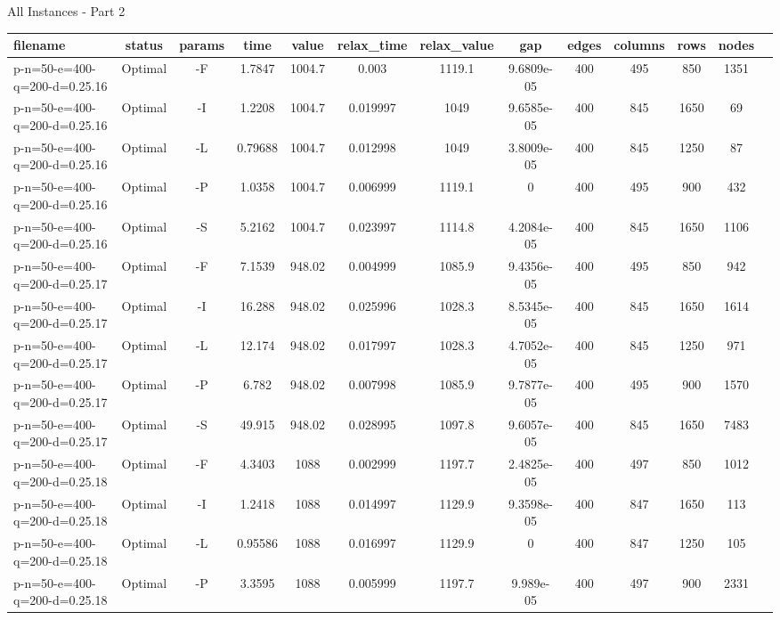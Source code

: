 \documentclass[landscape, a4paper]{article}
\begin{document}
\begin{center}
All Instances - Part 2

\begin{tabular}{lcccccccccccc}
filename & status & params & time & value & relax\_time & relax\_value & gap & edges & columns & rows & nodes & \\
\hline
p-n=50-e=400-q=200-d=0.25.16 & Optimal & -F & 1.7847 & 1004.7 & 0.003 & 1119.1 & 9.6809e-05 & 400 & 495 & 850 & 1351 & \\
p-n=50-e=400-q=200-d=0.25.16 & Optimal & -I & 1.2208 & 1004.7 & 0.019997 & 1049 & 9.6585e-05 & 400 & 845 & 1650 & 69 & \\
p-n=50-e=400-q=200-d=0.25.16 & Optimal & -L & 0.79688 & 1004.7 & 0.012998 & 1049 & 3.8009e-05 & 400 & 845 & 1250 & 87 & \\
p-n=50-e=400-q=200-d=0.25.16 & Optimal & -P & 1.0358 & 1004.7 & 0.006999 & 1119.1 & 0 & 400 & 495 & 900 & 432 & \\
p-n=50-e=400-q=200-d=0.25.16 & Optimal & -S & 5.2162 & 1004.7 & 0.023997 & 1114.8 & 4.2084e-05 & 400 & 845 & 1650 & 1106 & \\
p-n=50-e=400-q=200-d=0.25.17 & Optimal & -F & 7.1539 & 948.02 & 0.004999 & 1085.9 & 9.4356e-05 & 400 & 495 & 850 & 942 & \\
p-n=50-e=400-q=200-d=0.25.17 & Optimal & -I & 16.288 & 948.02 & 0.025996 & 1028.3 & 8.5345e-05 & 400 & 845 & 1650 & 1614 & \\
p-n=50-e=400-q=200-d=0.25.17 & Optimal & -L & 12.174 & 948.02 & 0.017997 & 1028.3 & 4.7052e-05 & 400 & 845 & 1250 & 971 & \\
p-n=50-e=400-q=200-d=0.25.17 & Optimal & -P & 6.782 & 948.02 & 0.007998 & 1085.9 & 9.7877e-05 & 400 & 495 & 900 & 1570 & \\
p-n=50-e=400-q=200-d=0.25.17 & Optimal & -S & 49.915 & 948.02 & 0.028995 & 1097.8 & 9.6057e-05 & 400 & 845 & 1650 & 7483 & \\
p-n=50-e=400-q=200-d=0.25.18 & Optimal & -F & 4.3403 & 1088 & 0.002999 & 1197.7 & 2.4825e-05 & 400 & 497 & 850 & 1012 & \\
p-n=50-e=400-q=200-d=0.25.18 & Optimal & -I & 1.2418 & 1088 & 0.014997 & 1129.9 & 9.3598e-05 & 400 & 847 & 1650 & 113 & \\
p-n=50-e=400-q=200-d=0.25.18 & Optimal & -L & 0.95586 & 1088 & 0.016997 & 1129.9 & 0 & 400 & 847 & 1250 & 105 & \\
p-n=50-e=400-q=200-d=0.25.18 & Optimal & -P & 3.3595 & 1088 & 0.005999 & 1197.7 & 9.989e-05 & 400 & 497 & 900 & 2331 & \\

\end{tabular}
\end{center}
\end{document}
